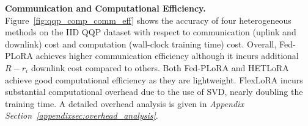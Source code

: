 \documentclass{article} %
\newcommand{\supplement}[1]{\textit{#1}}
\begin{document}
\noindent\textbf{Communication and Computational Efficiency.} Figure~\ref{fig:qqp_comp_comm_eff} shows the accuracy of four heterogeneous methods on the IID QQP dataset with respect to communication (uplink and downlink) cost and computation (wall-clock training time) cost. Overall, Fed-PLoRA achieves higher communication efficiency although it incurs additional $R-r_i$ downlink cost compared to others. Both Fed-PLoRA and HETLoRA achieve good computational efficiency as they are lightweight. FlexLoRA incurs substantial computational overhead due to the use of SVD, nearly doubling the training time. A detailed overhead analysis is given in \supplement{Appendix Section~\ref{appendixsec:overhead_analysis}}.



\end{document}
